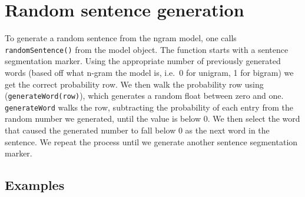 \documentclass{article}
\begin{document}
\section{Random sentence generation}
To generate a random sentence from the ngram model, one calls \texttt{randomSentence()} from the model object. The function starts with a sentence segmentation marker. Using the appropriate number of previously generated words (based off what n-gram the model is, i.e.\ 0 for unigram, 1 for bigram) we get the correct probability row. We then walk the probability row using (\texttt{generateWord(row)}), which generates a random float between zero and one. \texttt{generateWord} walks the row, subtracting the probability of each entry from the random number we generated, until the value is below 0. We then select the word that caused the generated number to fall below 0 as the next word in the sentence. We repeat the process until we generate another sentence segmentation marker.

\subsection{Examples}
\end{document}
